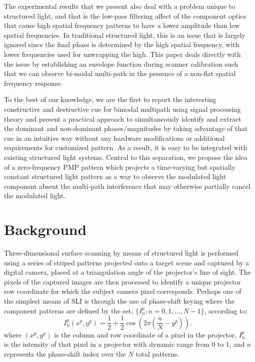 \documentclass[10pt]{article}
\begin{document}
The experimental results that we present also deal with a problem unique to structured light, and that is the low-pass filtering affect of the component optics that cause high spatial frequency patterns to have a lower amplitude than low spatial frequencies.  In traditional structured light, this is an issue that is largely ignored since the final phase is determined by the high spatial frequency, with lower frequencies used for unwrapping the high.  This paper deals directly with the issue by establishing an envelope function during scanner calibration such that we can observe bi-modal multi-path in the presence of a non-flat spatial frequency response. 

To the best of our knowledge, we are the first to report the interesting constructive and destructive cue for bimodal multipath using signal processing theory and present a practical approach to simultaneously identify and extract the dominant and non-dominant phases/magnitudes by taking advantage of that cue in an intuitive way without any hardware modifications or additional requirements for customized pattern. As a result, it is easy to be integrated with existing structured light systems. Central to this separation, we propose the idea of a zero-frequency PMP pattern which projects a time-varying but spatially constant structured light pattern as a way to observe the modulated light component absent the multi-path interference that may otherwise partially cancel the modulated light. 


\section{Background}
\noindent Three-dimensional surface scanning by means of structured light is performed using a series of striped patterns projected onto a target scene and captured by a digital camera, placed at a triangulation angle of the projector's line of sight.  The pixels of the captured images are then processed to identify a unique projector row coordinate for which the subject camera pixel corresponds. Perhaps one of the simplest means of SLI is through the use of phase-shift keying where the component patterns are defined by the set, $\{I^p_n:n=0,1,\ldots,N-1\}$, according to:
\begin{equation}
    \label{EQ:ProjectorPattern}
    I^p_n(x^p, y^p) = \frac{1}{2} + \frac{1}{2} \cos \left( 2\pi (\frac{n}{N}-y^p)\right).
\end{equation}
where $(x^p, y^p)$ is the column and row coordinate of a pixel in the projector, $I_n^p$ is the intensity of that pixel in a projector with dynamic range from 0 to 1, and $n$ represents the phase-shift index over the $N$ total patterns.
\end{document}
